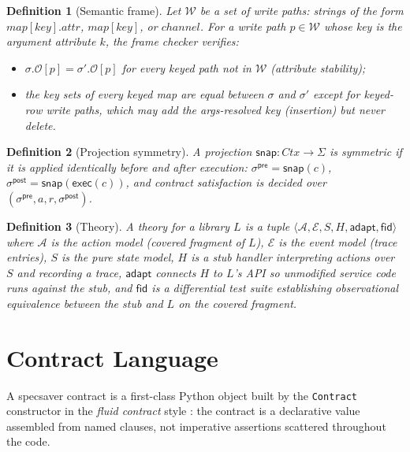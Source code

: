 \documentclass[11pt,a4paper]{article}
\newtheorem{definition}{Definition}
\begin{document}
\begin{definition}[Semantic frame]
Let $\mathcal{W}$ be a set of \emph{write paths}: strings of the form
$\mathit{map}[key].\mathit{attr}$, $\mathit{map}[key]$, or
$\mathit{channel}$.  For a write path $p \in \mathcal{W}$ whose key
is the argument attribute $k$, the frame checker verifies:
\begin{itemize}[nosep]
\item $\sigma.\mathcal{O}[p] = \sigma'.\mathcal{O}[p]$ for every
  keyed path not in $\mathcal{W}$ (attribute stability);
\item the key sets of every keyed map are equal between $\sigma$ and
  $\sigma'$ except for keyed-row write paths, which may add the
  args-resolved key (insertion) but never delete.
\end{itemize}
\end{definition}

\begin{definition}[Projection symmetry]
A projection $\mathsf{snap}: \mathit{Ctx} \to \Sigma$ is
\emph{symmetric} if it is applied identically before and after
execution: $\sigma^{\mathsf{pre}} = \mathsf{snap}(c)$,
$\sigma^{\mathsf{post}} = \mathsf{snap}(\mathsf{exec}(c))$, and
contract satisfaction is decided over
$(\sigma^{\mathsf{pre}}, a, r, \sigma^{\mathsf{post}})$.
\end{definition}

\begin{definition}[Theory]
A \emph{theory} for a library $L$ is a tuple
$\langle \mathcal{A}, \mathcal{E}, S, H, \mathsf{adapt},
\mathsf{fid} \rangle$ where $\mathcal{A}$ is the action model
(covered fragment of $L$), $\mathcal{E}$ is the event model (trace
entries), $S$ is the pure state model, $H$ is a stub handler
interpreting actions over $S$ and recording a trace,
$\mathsf{adapt}$ connects $H$ to $L$'s API so unmodified service code
runs against the stub, and $\mathsf{fid}$ is a differential test
suite establishing observational equivalence between the stub and $L$
on the covered fragment.
\end{definition}

\section{Contract Language}\label{sec:language}

A \textsf{specsaver} contract is a first-class Python object built by
the \texttt{Contract} constructor in the \emph{fluid contract} style
\cite{Meyer92,Leino10}: the contract is a declarative value assembled
from named clauses, not imperative assertions scattered throughout the
code.
\end{document}
